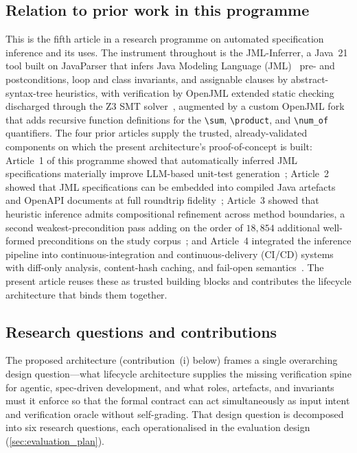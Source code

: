 \subsection{Relation to prior work in this programme}
\label{subsec:intro-prior}

This is the fifth article in a research programme on automated specification inference and its uses. The instrument throughout is the JML-Inferrer, a Java~21 tool built on JavaParser that infers Java Modeling Language (JML)~\cite{leavens2006jml} pre- and postconditions, loop and class invariants, and assignable clauses by abstract-syntax-tree heuristics, with verification by OpenJML extended static checking~\cite{cok2014openjml} discharged through the Z3 SMT solver~\cite{demoura2008z3}, augmented by a custom OpenJML fork that adds recursive function definitions for the \texttt{\textbackslash sum}, \texttt{\textbackslash product}, and \texttt{\textbackslash num\_of} quantifiers. The four prior articles supply the trusted, already-validated components on which the present architecture's proof-of-concept is built: Article~1 of this programme showed that automatically inferred JML specifications materially improve LLM-based unit-test generation~\cite{edmonds_article1}; Article~2 showed that JML specifications can be embedded into compiled Java artefacts and OpenAPI documents at full roundtrip fidelity~\cite{edmonds_article2}; Article~3 showed that heuristic inference admits compositional refinement across method boundaries, a second weakest-precondition pass adding on the order of $18{,}854$ additional well-formed preconditions on the study corpus~\cite{edmonds_article3}; and Article~4 integrated the inference pipeline into continuous-integration and continuous-delivery (CI/CD) systems with diff-only analysis, content-hash caching, and fail-open semantics~\cite{edmonds_article4}. The present article reuses these as trusted building blocks and contributes the lifecycle architecture that binds them together.

\subsection{Research questions and contributions}
\label{subsec:intro-rqs}

The proposed architecture (contribution~(i) below) frames a single overarching
design question---what lifecycle architecture supplies the missing verification
spine for agentic, spec-driven development, and what roles, artefacts, and
invariants must it enforce so that the formal contract can act simultaneously as
input intent and verification oracle without self-grading. That design question
is decomposed into six research questions, each operationalised in the evaluation
design (\cref{sec:evaluation_plan}).

